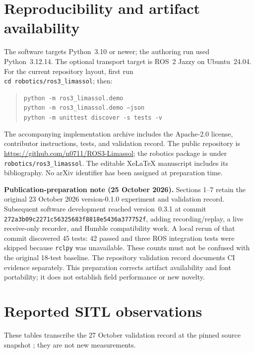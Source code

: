 \documentclass[11pt,a4paper]{article}
\newcommand{\code}[1]{\texttt{#1}}
\begin{document}
\section*{Reproducibility and artifact availability}
The software targets Python~3.10 or newer; the authoring run used Python~3.12.14.
The optional transport target is ROS~2 Jazzy on Ubuntu~24.04. For the current repository layout, first run\\
\code{cd robotics/ros3\_limassol}; then:
\begin{quote}\small
\code{python -m ros3\_limassol.demo}\\
\code{python -m ros3\_limassol.demo --json}\\
\code{python -m unittest discover -s tests -v}
\end{quote}
The accompanying implementation archive includes the Apache-2.0 license,
contributor instructions, tests, and validation record. The public repository is
\url{https://github.com/n0711/ROS3-Limassol}; the robotics package is under
\code{robotics/ros3\_limassol}. The editable XeLaTeX manuscript includes its
bibliography. No arXiv identifier has been assigned at preparation time.

\textbf{Publication-preparation note (25 October 2026).}
Sections 1--7 retain the original 23 October 2026 version-0.1.0 experiment and
validation record. Subsequent software development reached version~0.3.1 at
commit \code{272a3b09c2271c56325683f8818e5436a377752f}, adding recording/replay,
a live receive-only recorder, and Humble compatibility work. A local rerun of
that commit discovered 45 tests: 42 passed and three ROS integration tests were
skipped because \code{rclpy} was unavailable. These counts must not be confused
with the original 18-test baseline. The repository validation record documents
CI evidence separately. This preparation corrects artifact availability and
font portability; it does not establish field performance or new novelty.

\clearpage
\appendix
\section{Reported SITL observations}
\label{app:simulation-tables}
These tables transcribe the 27 October validation record at the pinned
source snapshot \cite{simulation_record}; they are not new measurements.
\end{document}
